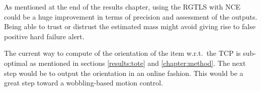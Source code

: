 \documentclass[/home/francois/latex/report/main.tex]{subfiles}
\begin{document}
As mentioned at the end of the results chapter, using the \ac{RGTLS} with \ac{NCE} could be a huge improvement in terms of precision and assessment of the outputs. Being able to trust or distrust the estimated mass might avoid giving rise to false positive hard failure alert.

The current way to compute of the orientation of the item w.r.t.\ the \ac{TCP} is sub-optimal as mentioned in sections \ref{results:tote} and \ref{chapter:method}. The next step would be to output the orientation in an online fashion. This would be a great step toward a wobbling-based motion control.
\end{document}
